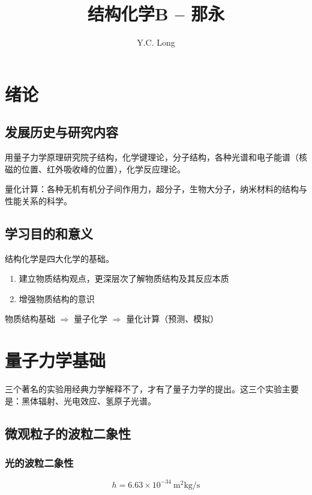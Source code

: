 \documentclass[a4paper]{ctexrep}
\title{结构化学B -- 那永}
\author{Y.C. Long}
\begin{document}
    \maketitle
    \chapter{绪论}
    \section{发展历史与研究内容}

    用量子力学原理研究院子结构，化学键理论，分子结构，各种光谱和电子能谱（核磁的位置、红外吸收峰的位置），化学反应理论。

    量化计算：各种无机有机分子间作用力，超分子，生物大分子，纳米材料的结构与性能关系的科学。

    \section{学习目的和意义}

    结构化学是四大化学的基础。

    \begin{enumerate}
        \item 建立物质结构观点，更深层次了解物质结构及其反应本质
        \item 增强物质结构的意识
    \end{enumerate}

    物质结构基础 $\Rightarrow$ 量子化学 $\Rightarrow$ 量化计算（预测、模拟）

    \chapter{量子力学基础}

    三个著名的实验用经典力学解释不了，才有了量子力学的提出。这三个实验主要是：黑体辐射、光电效应、氢原子光谱。

    \section{微观粒子的波粒二象性}

    \subsection{光的波粒二象性}

    \[
        h = 6.63 \times 10^{-34} \ \mathrm{m^2 kg / s}  
    \]
\end{document}
